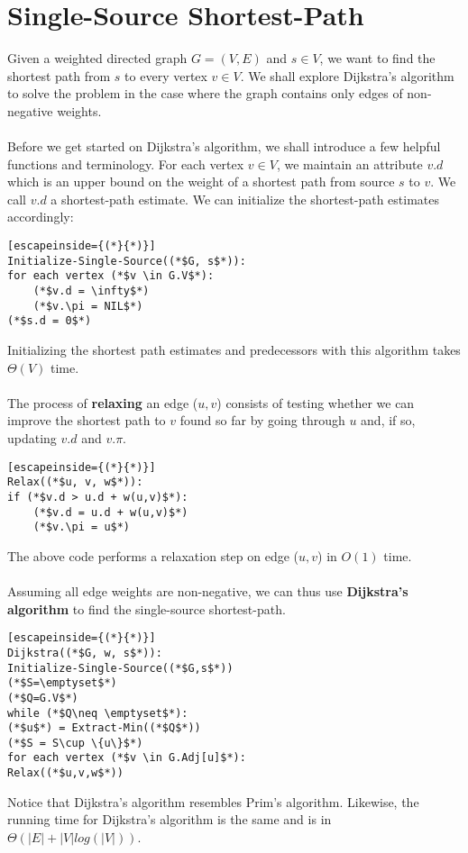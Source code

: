 \documentclass[a4paper]{article}
\begin{document}
\section{Single-Source Shortest-Path}
Given a weighted directed graph $G = (V,E)$ and $s \in V$, we want to find the shortest path from $s$ to every vertex $v\in V$. We shall explore Dijkstra's algorithm to solve the problem in the case where the graph contains only edges of non-negative weights.\\\\
Before we get started on Dijkstra's algorithm, we shall introduce a few helpful functions and terminology. For each vertex $v\in V$, we maintain an attribute $v.d$ which is an upper bound on the weight of a shortest path from source $s$ to $v$. We call $v.d$ a shortest-path estimate. We can initialize the shortest-path estimates accordingly:
\begin{lstlisting}[escapeinside={(*}{*)}]
Initialize-Single-Source((*$G, s$*)):
for each vertex (*$v \in G.V$*):
	(*$v.d = \infty$*)
	(*$v.\pi = NIL$*)
(*$s.d = 0$*)
\end{lstlisting}
Initializing the shortest path estimates and predecessors with this algorithm takes $\Theta(V)$ time.\\\\
The process of \textbf{relaxing} an edge ($u,v$) consists of testing whether we can improve the shortest path to $v$ found so far by going through $u$ and, if so, updating $v.d$ and $v.\pi$.
\begin{lstlisting}[escapeinside={(*}{*)}]
Relax((*$u, v, w$*)):
if (*$v.d > u.d + w(u,v)$*):
	(*$v.d = u.d + w(u,v)$*)
	(*$v.\pi = u$*)
\end{lstlisting}
The above code performs a relaxation step on edge ($u,v$) in $O(1)$ time.\\\\
Assuming all edge weights are non-negative, we can thus use \textbf{Dijkstra's algorithm} to find the single-source shortest-path.
\begin{lstlisting}[escapeinside={(*}{*)}]
Dijkstra((*$G, w, s$*)):
Initialize-Single-Source((*$G,s$*))
(*$S=\emptyset$*)
(*$Q=G.V$*)
while (*$Q\neq \emptyset$*):
(*$u$*) = Extract-Min((*$Q$*))
(*$S = S\cup \{u\}$*)
for each vertex (*$v \in G.Adj[u]$*):
Relax((*$u,v,w$*))
\end{lstlisting}
Notice that Dijkstra's algorithm resembles Prim's algorithm. Likewise, the running time for Dijkstra's algorithm is the same and is in $\Theta(|E| + |V| log(|V|))$.
\end{document}
